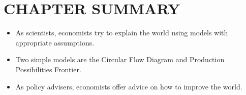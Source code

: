 \documentclass[
]{book}
\begin{document}
\hypertarget{chapter-summary-1}{%
\section{CHAPTER SUMMARY}\label{chapter-summary-1}}

\begin{itemize}
\item
  As scientists, economists try to explain the world using models with appropriate assumptions.
\item
  Two simple models are the Circular Flow Diagram and Production Possibilities Frontier.
\item
  As policy advisers, economists offer advice on how to improve the world.
\end{itemize}
\end{document}
